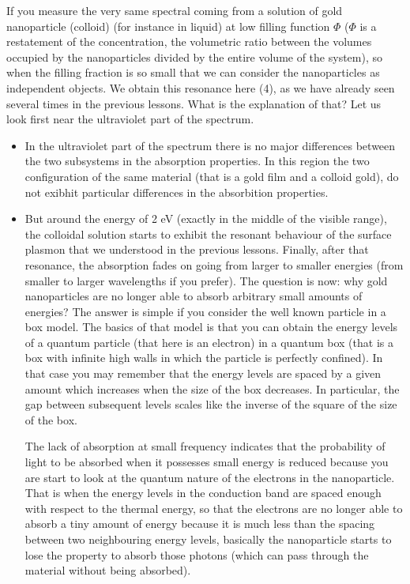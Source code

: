 \documentclass[../main/main.tex]{subfiles}
\begin{document}
If you measure the very same spectral coming from a solution of gold nanoparticle (colloid) (for instance in liquid) at low filling function \( \Phi  \) ($\Phi$ is a restatement of the concentration, the volumetric ratio between the volumes occupied by the nanoparticles divided by the entire volume of the system), so when the filling fraction is so small that we can consider the nanoparticles as independent objects.
We obtain this resonance here (4), as we have already seen several times in the previous lessons.
What is the explanation of that? Let us look first near the ultraviolet part of the spectrum.
\begin{itemize}
\item In the ultraviolet part of the spectrum there is no major differences between the two subsystems in the absorption properties. In this region the two configuration of the same material (that is a gold film and a colloid gold), do not exibhit particular differences in the absorbition properties.

\item But around the energy of 2 eV (exactly in the middle of the visible range), the colloidal solution starts to exhibit the resonant behaviour of the surface plasmon that we understood in the previous lessons. Finally, after that resonance, the absorption fades on going from larger to smaller energies (from smaller to larger wavelengths if you prefer).
The question is now: why gold nanoparticles are no longer able to absorb arbitrary small amounts of energies?
The answer is simple if you consider the well known particle in a box model. The basics of that model is that you can obtain the energy levels of a quantum particle (that here is an electron) in a quantum box (that is a box with infinite high walls in which the particle is perfectly confined). In that case you may remember that the energy levels are spaced by a given amount which increases when the size of the box decreases.
In particular, the gap between subsequent levels scales like the inverse of the square of the size of the box.

The lack of absorption at small frequency indicates that the probability of light to be absorbed when it possesses small energy is reduced because you are start to look at the quantum nature of the electrons in the nanoparticle.
That is when the energy levels in the conduction band are spaced enough with respect to the thermal energy, so that the electrons are no longer able to absorb a tiny amount of energy because it is much less than the spacing between two neighbouring energy levels, basically the nanoparticle starts to lose the property to absorb those photons (which can pass through the material without being absorbed).

\end{itemize}
\end{document}
